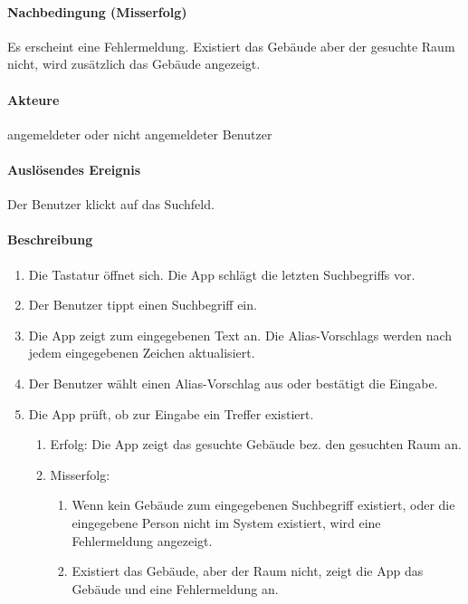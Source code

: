 \paragraph{Nachbedingung (Misserfolg)}
Es erscheint eine Fehlermeldung. Existiert das Gebäude aber der gesuchte Raum nicht, wird zusätzlich das Gebäude angezeigt.
\paragraph{Akteure}
angemeldeter oder nicht angemeldeter \Gls{Benutzer}
\paragraph{Auslösendes Ereignis}
Der \Gls{Benutzer} klickt auf das \Gls{Suchfeld}.
\paragraph{Beschreibung}
\begin{enumerate}
    \item Die Tastatur öffnet sich. Die App schlägt die letzten \Glspl{Suchbegriff} vor.
    \item Der \Gls{Benutzer} tippt einen \Gls{Suchbegriff} ein.
    \item Die App zeigt  zum eingegebenen Text an. Die \Glspl{Alias-Vorschlag} werden nach jedem eingegebenen Zeichen aktualisiert.
    \item Der \Gls{Benutzer} wählt einen \Gls{Alias-Vorschlag} aus oder bestätigt die Eingabe.
    \item Die App prüft, ob zur Eingabe ein Treffer existiert.
        \begin{enumerate}
            \item{Erfolg:} Die App zeigt das gesuchte Gebäude bez. den gesuchten Raum an.
            \item{Misserfolg:} 
            \begin{enumerate}
                \item Wenn kein Gebäude zum eingegebenen \Gls{Suchbegriff} existiert, oder die eingegebene Person nicht im System existiert, wird eine Fehlermeldung angezeigt.
                \item Existiert das Gebäude, aber der Raum nicht, zeigt die App das Gebäude und eine Fehlermeldung an.
            \end{enumerate}
        \end{enumerate}
\end{enumerate}
